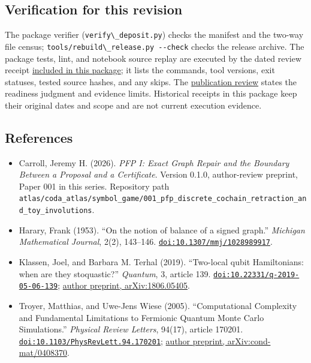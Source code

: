 \documentclass[
  11pt,
]{article}
\newcommand{\passthrough}[1]{#1}
\providecommand{\tightlist}{%
  \setlength{\itemsep}{0pt}\setlength{\parskip}{0pt}}
\begin{document}
\hypertarget{verification-for-this-revision}{%
\subsection{Verification for this
revision}\label{verification-for-this-revision}}

The package verifier (\passthrough{\lstinline!verify\_deposit.py!})
checks the manifest and the two-way file census;
\passthrough{\lstinline!tools/rebuild\_release.py --check!} checks the
release archive. The package tests, lint, and notebook source replay are
executed by the dated review receipt
\href{https://github.com/dbccpage/the_symbol_game/blob/main/education/documentation/030_pfp_proposal_fidelity_protocol_pfp/papers/symbol_game/002_pfp_signed_presentations_and_search_frontier/docs/preprint_review_validation_2026_10_02.json}{included
in this package}; it lists the commands, tool versions, exit statuses,
tested source hashes, and any skips. The
\href{https://github.com/dbccpage/the_symbol_game/blob/main/education/documentation/030_pfp_proposal_fidelity_protocol_pfp/papers/symbol_game/002_pfp_signed_presentations_and_search_frontier/docs/preprint_review_2026_10_02.md}{publication
review} states the readiness judgment and evidence limits. Historical
receipts in this package keep their original dates and scope and are not
current execution evidence.

\hypertarget{references}{%
\subsection{References}\label{references}}

\begin{itemize}
\tightlist
\item
  Carroll, Jeremy H. (2026). \emph{PFP I: Exact Graph Repair and the
  Boundary Between a Proposal and a Certificate}. Version 0.1.0,
  author-review preprint, Paper 001 in this series. Repository path
  \nolinkurl{atlas/coda_atlas/symbol_game/001_pfp_discrete_cochain_retraction_and_toy_involutions}.
\item
  Harary, Frank (1953). ``On the notion of balance of a signed graph.''
  \emph{Michigan Mathematical Journal}, 2(2), 143--146.
  \href{https://doi.org/10.1307/mmj/1028989917}{\nolinkurl{doi:10.1307/mmj/1028989917}}.
\item
  Klassen, Joel, and Barbara M. Terhal (2019). ``Two-local qubit
  Hamiltonians: when are they stoquastic?'' \emph{Quantum}, 3, article
  139.
  \href{https://doi.org/10.22331/q-2019-05-06-139}{\nolinkurl{doi:10.22331/q-2019-05-06-139}};
  \href{https://arxiv.org/abs/1806.05405}{author preprint,
  arXiv:1806.05405}.
\item
  Troyer, Matthias, and Uwe-Jens Wiese (2005). ``Computational
  Complexity and Fundamental Limitations to Fermionic Quantum Monte
  Carlo Simulations.'' \emph{Physical Review Letters}, 94(17), article
  170201.
  \href{https://doi.org/10.1103/PhysRevLett.94.170201}{\nolinkurl{doi:10.1103/PhysRevLett.94.170201}};
  \href{https://arxiv.org/abs/cond-mat/0408370}{author preprint,
  arXiv:cond-mat/0408370}.
\end{itemize}
\end{document}
